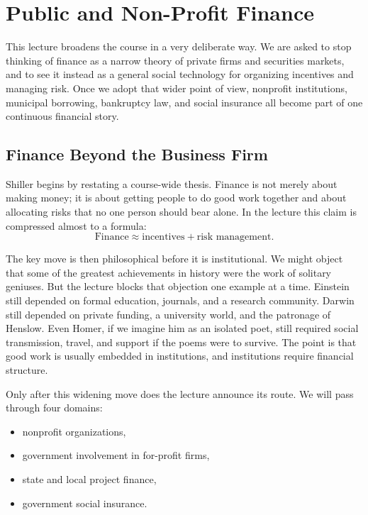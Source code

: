 \chapter{Public and Non-Profit Finance}

This lecture broadens the course in a very deliberate way. We are asked to stop thinking of finance as a narrow theory of private firms and securities markets, and to see it instead as a general social technology for organizing incentives and managing risk. Once we adopt that wider point of view, nonprofit institutions, municipal borrowing, bankruptcy law, and social insurance all become part of one continuous financial story.

\section{Finance Beyond the Business Firm}

Shiller begins by restating a course-wide thesis. Finance is not merely about making money; it is about getting people to do good work together and about allocating risks that no one person should bear alone. In the lecture this claim is compressed almost to a formula:
\begin{equation}
\text{Finance} \approx \text{incentives} + \text{risk management}.
\end{equation}

The key move is then philosophical before it is institutional. We might object that some of the greatest achievements in history were the work of solitary geniuses. But the lecture blocks that objection one example at a time. Einstein still depended on formal education, journals, and a research community. Darwin still depended on private funding, a university world, and the patronage of Henslow. Even Homer, if we imagine him as an isolated poet, still required social transmission, travel, and support if the poems were to survive. The point is that good work is usually embedded in institutions, and institutions require financial structure.

Only after this widening move does the lecture announce its route. We will pass through four domains:
\begin{itemize}
\item nonprofit organizations,
\item government involvement in for-profit firms,
\item state and local project finance,
\item government social insurance.
\end{itemize}

